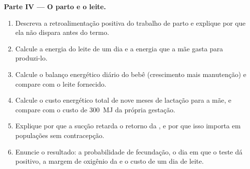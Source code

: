 \begin{problem}
\medskip
\noindent\textbf{Parte IV --- O parto e o leite.}
\begin{enumerate}[resume]
  \item Descreva a retroalimentação positiva do trabalho de parto e
        explique por que ela não dispara antes do termo.
  \item Calcule a energia do leite de um dia e a energia que a mãe gasta
        para produzi-lo.
  \item Calcule o balanço energético diário do bebê (crescimento mais
        manutenção) e compare com o leite fornecido.
  \item Calcule o custo energético total de nove meses de lactação para
        a mãe, e compare com o custo de \qty{300}{MJ} da própria
        gestação.
  \item Explique por que a sucção retarda o retorno da , e por
        que isso importa em populações sem contracepção.
  \item Enuncie o resultado: a probabilidade de fecundação, o dia em
        que o teste dá positivo, a margem de oxigênio da  e o
        custo de um dia de leite.
\end{enumerate}
\end{problem}
